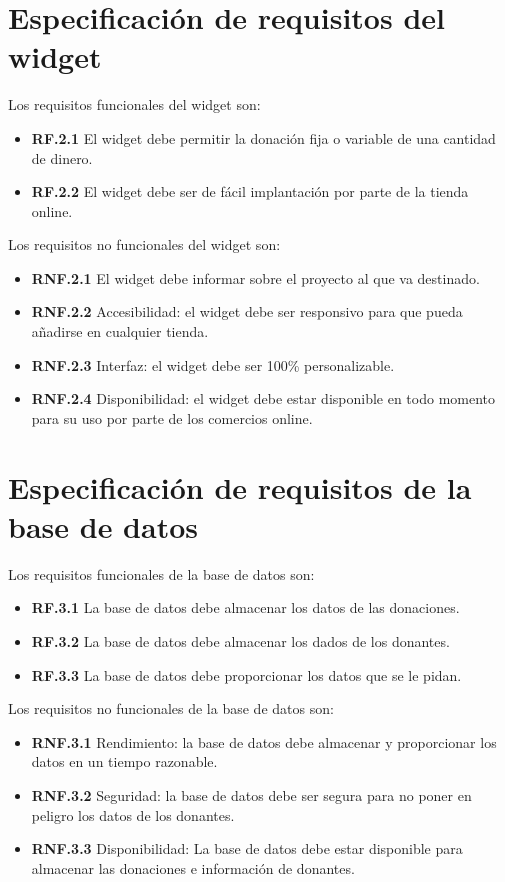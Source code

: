 \section{Especificación de requisitos del widget}

Los requisitos funcionales del widget son:

\begin{itemize}
	\item \textbf{RF.2.1} El widget debe permitir la donación fija o variable de una cantidad de dinero.
	\item \textbf{RF.2.2} El widget debe ser de fácil implantación por parte de la tienda online.
\end{itemize}

Los requisitos no funcionales del widget son:

\begin{itemize}
	\item \textbf{RNF.2.1} El widget debe informar sobre el proyecto al que va destinado.
	\item \textbf{RNF.2.2} Accesibilidad: el widget debe ser responsivo para que pueda añadirse en cualquier tienda.
	\item \textbf{RNF.2.3} Interfaz: el widget debe ser 100\% personalizable.
	\item \textbf{RNF.2.4} Disponibilidad: el widget debe estar disponible en todo momento para su uso por parte de los comercios online.
\end{itemize}

\section{Especificación de requisitos de la base de datos}

Los requisitos funcionales de la base de datos son:

\begin{itemize}
	\item \textbf{RF.3.1} La base de datos debe almacenar los datos de las donaciones.
	\item \textbf{RF.3.2} La base de datos debe almacenar los dados de los donantes.
	\item \textbf{RF.3.3} La base de datos debe proporcionar los datos que se le pidan.
\end{itemize}

Los requisitos no funcionales de la base de datos son:

\begin{itemize}
	\item \textbf{RNF.3.1} Rendimiento: la base de datos debe almacenar y proporcionar los datos en un tiempo razonable.
	\item \textbf{RNF.3.2} Seguridad: la base de datos debe ser segura para no poner en peligro los datos de los donantes.
	\item \textbf{RNF.3.3} Disponibilidad: La base de datos debe estar disponible para almacenar las donaciones e información de donantes.
\end{itemize}

